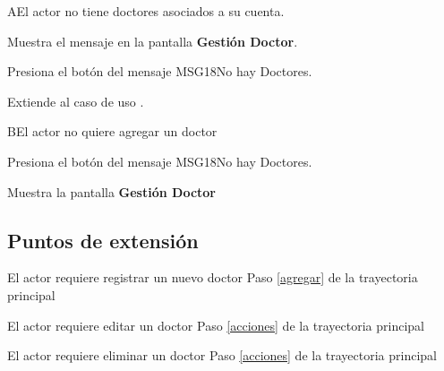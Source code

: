  \begin{UCtrayectoriaA}{A}{El actor no tiene doctores asociados a su cuenta.}
    
   	\UCpaso Muestra el mensaje  en la pantalla \textbf{Gestión Doctor}.
    
    \UCpaso [\UCactor] Presiona el botón  del mensaje {MSG18}{No hay Doctores}.  
    
    \UCpaso Extiende al caso de uso . \label{agregar}
   
 
\end{UCtrayectoriaA}

\begin{UCtrayectoriaA}{B}{El actor no quiere agregar un doctor}
	
	\UCpaso [\UCactor] Presiona el botón  del mensaje {MSG18}{No hay Doctores}.
	
	\UCpaso Muestra la pantalla \textbf{Gestión Doctor}
	
\end{UCtrayectoriaA}

 
\subsection{Puntos de extensión}

\UCExtensionPoint
{El actor requiere registrar un nuevo doctor}
{ Paso \ref{agregar} de la trayectoria principal}
{}


\UCExtensionPoint
{El actor requiere editar un doctor}
{ Paso \ref{acciones} de la trayectoria principal}
{}
 
 
\UCExtensionPoint
{El actor requiere eliminar un doctor}
{ Paso \ref{acciones} de la trayectoria principal}
{}

